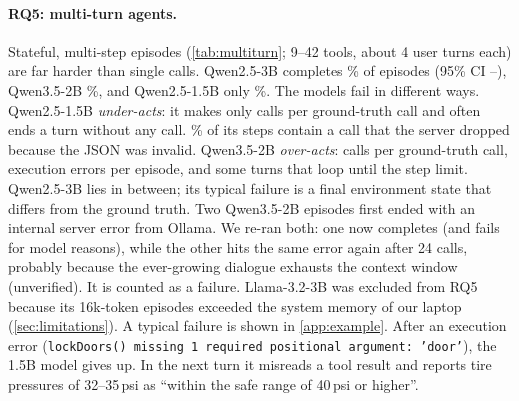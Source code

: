 \begin{table}[t]
  \centering
  \caption{RQ5: 30 randomly sampled \texttt{multi\_turn\_base} episodes in BFCL's executable environments, scored by the official checker. \emph{Calls / GT calls}: executed calls relative to the ground truth. \emph{Dropped calls}: agent steps whose raw tokens contain a call that the server silently discarded. \emph{Forced quit}: share of episodes that hit the 20-step limit of a turn.}
  \label{tab:multiturn}
  \small
  \setlength{\tabcolsep}{4pt}
  \resizebox{\linewidth}{!}{}
\end{table}

\paragraph{RQ5: multi-turn agents.}
Stateful, multi-step episodes (\cref{tab:multiturn}; 9--42 tools, about 4 user turns each) are far harder than single calls.
Qwen2.5-3B completes \MtSuccQwenThree\% of episodes (95\% CI \MtLoQwenThree--\MtHiQwenThree), Qwen3.5-2B \MtSuccQwenThreeFive\%, and Qwen2.5-1.5B only \MtSuccQwenOneFive\%.
The models fail in different ways.
Qwen2.5-1.5B \emph{under-acts}: it makes only \MtCallsQwenOneFive{} calls per ground-truth call and often ends a turn without any call. \MtDroppedQwenOneFive\% of its steps contain a call that the server dropped because the JSON was invalid.
Qwen3.5-2B \emph{over-acts}: \MtCallsQwenThreeFive{} calls per ground-truth call, \MtExecErrQwenThreeFive{} execution errors per episode, and some turns that loop until the step limit.
Qwen2.5-3B lies in between; its typical failure is a final environment state that differs from the ground truth.
Two Qwen3.5-2B episodes first ended with an internal server error from Ollama. We re-ran both: one now completes (and fails for model reasons), while the other hits the same error again after 24 calls, probably because the ever-growing dialogue exhausts the context window (unverified). It is counted as a failure. Llama-3.2-3B was excluded from RQ5 because its 16k-token episodes exceeded the system memory of our laptop (\cref{sec:limitations}).
A typical failure is shown in \cref{app:example}. After an execution error (\texttt{lockDoors() missing 1 required positional argument: 'door'}), the 1.5B model gives up. In the next turn it misreads a tool result and reports tire pressures of 32--35\,psi as ``within the safe range of 40\,psi or higher''.

